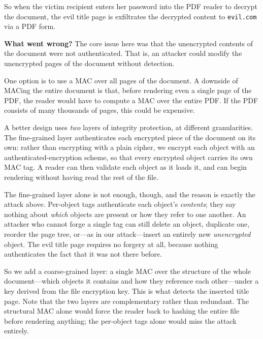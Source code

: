 \documentclass[
  letterpaper,
]{scrbook}
\theoremstyle{definition}
\theoremstyle{plain}
\theoremstyle{plain}
\theoremstyle{remark}
\begin{document}
So when the victim recipient enters her password into the PDF reader to
decrypt the document, the evil title page is exfiltrates the decrypted
content to \texttt{evil.com} via a PDF form.

\textbf{What went wrong?} The core issue here was that the unencrypted
contents of the document were not authenticated. That is, an attacker
could modify the unencrypted pages of the document without detection.

One option is to use a MAC over all pages of the document. A downside of
MACing the entire document is that, before rendering even a single page
of the PDF, the reader would have to compute a MAC over the entire PDF.
If the PDF consists of many thousands of pages, this could be expensive.

A better design uses \emph{two} layers of integrity protection, at
different granularities. The fine-grained layer authenticates each
encrypted piece of the document on its own: rather than encrypting with
a plain cipher, we encrypt each object with an authenticated-encryption
scheme, so that every encrypted object carries its own MAC tag. A reader
can then validate each object as it loads it, and can begin rendering
without having read the rest of the file.


The fine-grained layer alone is not enough, though, and the reason is
exactly the attack above. Per-object tags authenticate each object's
\emph{contents}; they say nothing about \emph{which} objects are present
or how they refer to one another. An attacker who cannot forge a single
tag can still delete an object, duplicate one, reorder the page tree,
or---as in our attack---insert an entirely new \emph{unencrypted}
object. The evil title page requires no forgery at all, because nothing
authenticates the fact that it was not there before.

So we add a coarse-grained layer: a single MAC over the structure of the
whole document---which objects it contains and how they reference each
other---under a key derived from the file encryption key. This is what
detects the inserted title page. Note that the two layers are
complementary rather than redundant. The structural MAC alone would
force the reader back to hashing the entire file before rendering
anything; the per-object tags alone would miss the attack entirely.
\end{document}
